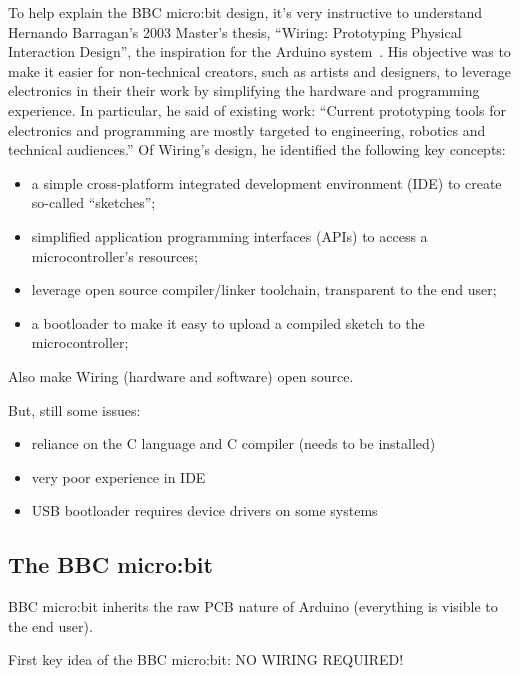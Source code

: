 To help explain the BBC micro:bit design, it's very instructive to understand
Hernando Barragan's 2003 Master's thesis, ``Wiring: Prototyping Physical Interaction Design'',
the inspiration for the Arduino system~\cite{Barragan}. His objective was to make it easier
for non-technical creators, such as artists and designers, to leverage
electronics in their their work by simplifying the hardware and programming
experience. In particular, he said of existing work:
``Current prototyping tools for electronics and programming are mostly targeted 
to engineering, robotics and technical audiences.''  
Of Wiring's design, he identified the following key concepts:
\begin{itemize}
\item a simple cross-platform integrated development environment (IDE) to create so-called ``sketches'';
\item simplified application programming interfaces (APIs) to access a microcontroller's resources;
\item leverage open source compiler/linker toolchain, transparent to the end user;
\item a bootloader to make it easy to upload a compiled sketch to the microcontroller;
\end{itemize}
Also make Wiring (hardware and software) open source.

But, still some issues:
\begin{itemize}
    \item reliance on the C language and C compiler (needs to be installed)
    \item very poor experience in IDE
    \item USB bootloader requires device drivers on some systems 
\end{itemize}

\subsection{The BBC micro:bit}

BBC micro:bit inherits the raw PCB nature of Arduino (everything is visible to the end user).

First key idea of the BBC micro:bit: NO WIRING REQUIRED!



